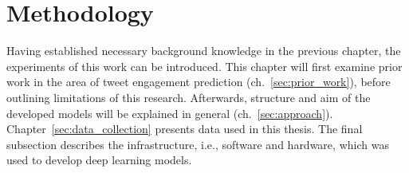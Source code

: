 \section{Methodology}
\label{ch:methodology}

Having established necessary background knowledge in the previous chapter,
the experiments of this work can be introduced.
This chapter will first examine prior work in the area of tweet engagement
prediction (ch.~\ref{sec:prior_work}), before outlining limitations of this
research.
Afterwards, structure and aim of the developed models will be explained in general (ch.~\ref{sec:approach}).
Chapter~\ref{sec:data_collection} presents data used in this thesis.
The final subsection describes the infrastructure, i.e., software and hardware,
which was used to develop deep learning models.









